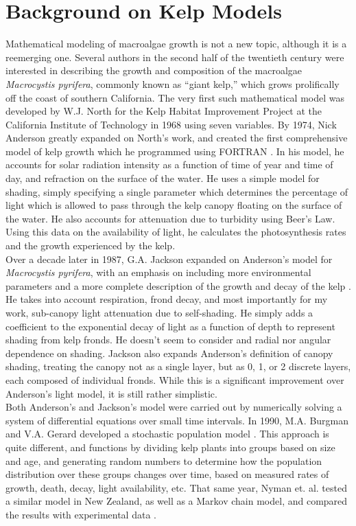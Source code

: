 \section{Background on Kelp Models}

Mathematical modeling of macroalgae growth is not a new topic, although it is a reemerging one.
Several authors in the second half of the twentieth century were interested in describing the growth and composition of the macroalgae \textit{Macrocystis pyrifera}, commonly known as ``giant kelp,'' which grows prolifically off the coast of southern California.
The very first such mathematical model was developed by W.J. North for the Kelp Habitat Improvement Project at the California Institute of Technology in 1968 using seven variables.
By 1974, Nick Anderson greatly expanded on North's work, and created the first comprehensive model of kelp growth which he programmed using FORTRAN \cite{anderson_mathematical_1974}.
In his model, he accounts for solar radiation intensity as a function of time of year and time of day, and refraction on the surface of the water.
He uses a simple model for shading, simply specifying a single parameter which determines the percentage of light which is allowed to pass through the kelp canopy floating on the surface of the water.
He also accounts for attenuation due to turbidity using Beer's Law.
Using this data on the availability of light, he calculates the photosynthesis rates and the growth experienced by the kelp. \\[-0.75em]

Over a decade later in 1987, G.A.
Jackson expanded on Anderson's model for \textit{Macrocystis pyrifera}, with an emphasis on including more environmental parameters and a more complete description of the growth and decay of the kelp \cite{jackson_modelling_1987}. 
He takes into account respiration, frond decay, and most importantly for my work, sub-canopy light attenuation due to self-shading.
He simply adds a coefficient to the exponential decay of light as a function of depth to represent shading from kelp fronds.
He doesn't seem to consider and radial nor angular dependence on shading.
Jackson also expands Anderson's definition of canopy shading, treating the canopy not as a single layer, but as 0, 1, or 2 discrete layers, each composed of individual fronds.
While this is a significant improvement over Anderson's light model, it is still rather simplistic. \\[-0.75em]

Both Anderson's and Jackson's model were carried out by numerically solving a system of differential equations over small time intervals.
In 1990, M.A. Burgman and V.A. Gerard developed a stochastic population model \cite{burgman_stage-structured_1990}.
This approach is quite different, and functions by dividing kelp plants into groups based on size and age, and generating random numbers to determine how the population distribution over these groups changes over time, based on measured rates of growth, death, decay, light availability, etc.
That same year, Nyman et. al. tested a similar model in New Zealand, as well as a Markov chain model, and compared the results with experimental data \cite{nyman_macrocystis_1990}. \\[-0.75em]

